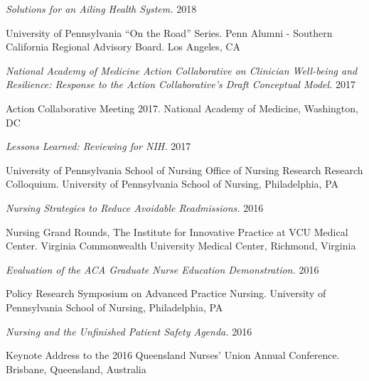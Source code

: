 \documentclass[10pt,]{article}
\begin{document}
{{{{{{{{{{{{{{\begin{hangparas}{.5in}{1}
{\textit {Solutions for an Ailing Health System.}} \hfill 2018 
\vspace{-2.5mm}
\begin{adjustwidth}{0.5cm}{1cm}
University of Pennsylvania “On the Road” Series. Penn Alumni - Southern California Regional Advisory Board. Los Angeles, CA
\end{adjustwidth}

{\textit {National Academy of Medicine Action Collaborative on Clinician Well-being and Resilience: Response to the Action Collaborative’s Draft Conceptual Model.}} \hfill 2017 
\vspace{-2.5mm}
\begin{adjustwidth}{0.5cm}{1cm}
Action Collaborative Meeting 2017. National Academy of Medicine, Washington, DC
\end{adjustwidth}

{\textit {Lessons Learned: Reviewing for NIH.}} \hfill 2017 
\vspace{-2.5mm}
\begin{adjustwidth}{0.5cm}{1cm}
University of Pennsylvania School of Nursing Office of Nursing Research Research Colloquium. University of Pennsylvania School of Nursing, Philadelphia, PA
\end{adjustwidth}

{\textit {Nursing Strategies to Reduce Avoidable Readmissions.}} \hfill 2016 
\vspace{-2.5mm}
\begin{adjustwidth}{0.5cm}{1cm}
Nursing Grand Rounds, The Institute for Innovative Practice at VCU Medical Center. Virginia Commonwealth University Medical Center, Richmond, Virginia
\end{adjustwidth}

{\textit {Evaluation of the ACA Graduate Nurse Education Demonstration.}} \hfill 2016 
\vspace{-2.5mm}
\begin{adjustwidth}{0.5cm}{1cm}
Policy Research Symposium on Advanced Practice Nursing. University of Pennsylvania School of Nursing, Philadelphia, PA
\end{adjustwidth}

{\textit {Nursing and the Unfinished Patient Safety Agenda.}} \hfill 2016 
\vspace{-2.5mm}
\begin{adjustwidth}{0.5cm}{1cm}
Keynote Address to the 2016 Queensland Nurses’ Union Annual Conference. Brisbane, Queensland, Australia
\end{adjustwidth}


\end{hangparas}}}}}}}}}}}}}}}
\end{document}
